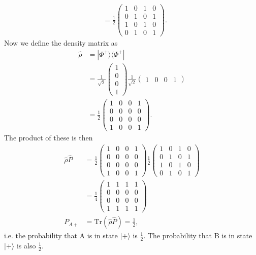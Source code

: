 \documentclass[a4paper, 11pt, normalem]{report}
\begin{document}
\begin{example}
\begin{align}
                &= \frac12 \begin{pmatrix} 1 & 0 & 1 & 0 \\ 0 & 1 & 0 & 1 \\ 1 & 0 & 1 & 0 \\ 0 & 1 & 0 & 1\end{pmatrix}.
    \end{align}
    Now we define the density matrix as
    \begin{align}
        \hat{\rho} &= |\Phi^+\rangle\langle\Phi^+| \\
                   &= \frac{1}{\sqrt{2}}\begin{pmatrix} 1 \\ 0 \\ 0 \\ 1\end{pmatrix}\frac{1}{\sqrt{2}}\begin{pmatrix} 1 & 0 & 0 & 1\end{pmatrix} \\
                   &= \frac12 \begin{pmatrix} 1 & 0 & 0 & 1 \\ 0 & 0 & 0 & 0 \\0 & 0 & 0 & 0 \\ 1 & 0 & 0 & 1 \end{pmatrix}.
    \end{align}
    The product of these is then
    \begin{align}
        \hat{\rho}\hat{P} &= \frac12\begin{pmatrix} 1 & 0 & 0 & 1 \\ 0 &0&0 & 0 \\ 0 & 0 & 0 & 0 \\ 1 & 0 & 0 & 1\end{pmatrix}\frac12 \begin{pmatrix} 1 & 0 & 1 & 0 \\ 0 & 1 & 0 & 1 \\ 1 & 0 & 1 & 0 \\ 0 & 1 & 0 & 1\end{pmatrix} \\
                          &= \frac14\begin{pmatrix} 1&1&1&1\\0&0&0&0\\0&0&0&0\\1&1&1&1\end{pmatrix}\\
        P_{A+} &= \text{Tr}(\hat{\rho}\hat{P}) = \frac12,
    \end{align}
    i.e. the probability that A is in state $|+\rangle$ is $\frac12$.
    The probability that B is in state $|+\rangle$ is also $\frac12$.


\end{example}
\end{document}
